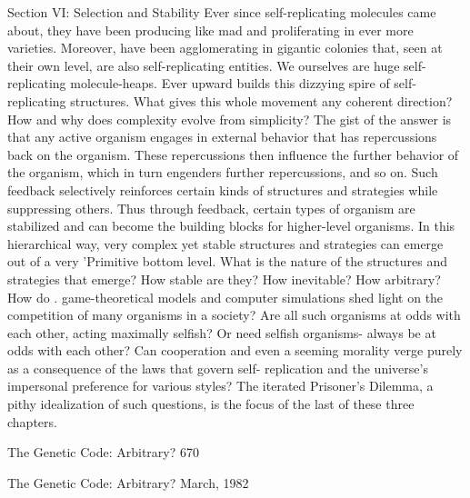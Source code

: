 
                                  Section VI:
                                            Selection and Stability
Ever since self-replicating molecules came about, they have been producing like mad
and proliferating in ever more varieties. Moreover, have been agglomerating in
gigantic colonies that, seen at their own level, are also self-replicating entities. We
ourselves are huge self-replicating molecule-heaps. Ever upward builds this dizzying
spire of self-replicating structures. What gives this whole movement any coherent
direction? How and why does complexity evolve from simplicity? The gist of the
answer is that any active organism engages in external behavior that has repercussions
back on the organism. These repercussions then influence the further behavior of the
organism, which in turn engenders further repercussions, and so on. Such feedback
selectively reinforces certain kinds of structures and strategies while suppressing
others. Thus through feedback, certain types of organism are stabilized and can
become the building blocks for higher-level organisms. In this hierarchical way, very
complex yet stable structures and strategies can emerge out of a very 'Primitive
bottom level. What is the nature of the structures and strategies that emerge? How
stable are they? How inevitable? How arbitrary? How do . game-theoretical models
and computer simulations shed light on the competition of many organisms in a
society? Are all such organisms at odds with each other, acting maximally selfish? Or
need selfish organisms- always be at odds with each other? Can cooperation and even
a seeming morality verge purely as a consequence of the laws that govern self-
replication and the universe's impersonal preference for various styles? The iterated
Prisoner's Dilemma, a pithy idealization of such questions, is the focus of the last of
these three chapters.




The Genetic Code: Arbitrary?                                                       670


                   The Genetic Code: Arbitrary?
                                     March, 1982

